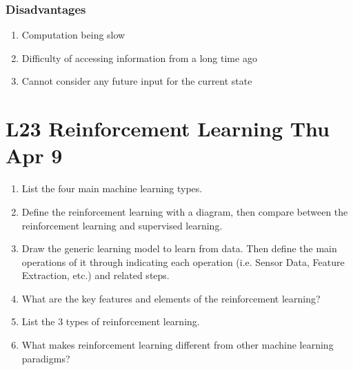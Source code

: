 \documentclass[12pt]{article}
\newenvironment{QandA}{\begin{enumerate}[label=\bfseries\arabic*.]\bfseries}
{\end{enumerate}}
\newenvironment{answered}{\par\normalfont\color{Sepia}}{}
\begin{document}
\begin{QandA}
\begin{answered}
        \subsubsection*{Disadvantages}
        \begin{enumerate}
            \item Computation being slow
            \item Difficulty of accessing information from a long time ago
            \item Cannot consider any future input for the current state
        \end{enumerate}
    \end{answered}

\end{QandA}

\section*{L23 Reinforcement Learning \textemdash{} Thu Apr 9}
\begin{QandA}
    \item List the four main machine learning types.
    \begin{answered}
    \end{answered}

    \item Define the reinforcement learning with a diagram, then compare between the
          reinforcement learning and supervised learning.
    \begin{answered}
    \end{answered}

    \item Draw the generic learning model to learn from data. Then define the main operations of
          it through indicating each operation (i.e. Sensor Data, Feature Extraction, etc.) and
          related steps.
    \begin{answered}
    \end{answered}

    \item What are the key features and elements of the reinforcement learning?
    \begin{answered}
    \end{answered}

    \item List the 3 types of reinforcement learning.
    \begin{answered}
    \end{answered}

    \item What makes reinforcement learning different from other machine learning paradigms?
    \begin{answered}
    \end{answered}

\end{QandA}
\end{document}
